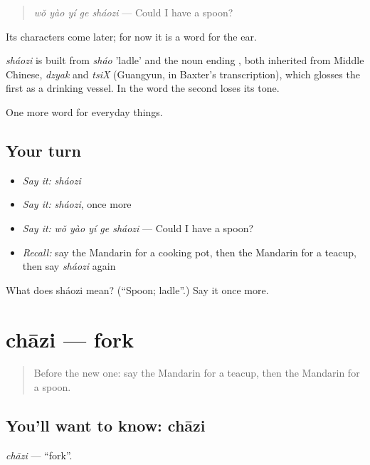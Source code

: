 \begin{quote}
\emph{wǒ yào yí ge sháozi} — Could I have a spoon?
\end{quote}

Its characters come later; for now it is a word for the ear.

\begin{cousinweb}
\emph{sháozi} is built from \emph{sháo} 'ladle' and the noun ending , both inherited from Middle Chinese, \emph{dzyak} and \emph{tsiX} (Guangyun, in Baxter's transcription), which glosses the first as a drinking vessel. In the word the second loses its tone.
\end{cousinweb}

\begin{grammarlens}[title={What you've built}]
One more word for everyday things.
\end{grammarlens}

\subsection*{Your turn}
\begin{itemize}
\raggedright
  \item \emph{Say it:} \emph{sháozi}
  \item \emph{Say it:} \emph{sháozi}, once more
  \item \emph{Say it:} \emph{wǒ yào yí ge sháozi} — Could I have a spoon?
  \item \emph{Recall:} say the Mandarin for a cooking pot, then the Mandarin for a teacup, then say \emph{sháozi} again
\end{itemize}

\begin{tcolorbox}[breakable,colback=teal!4,colframe=teal!35!black,title={Before you move on}]
What does sháozi mean? (\textquotedblleft{}Spoon; ladle\textquotedblright{}.) Say it once more.
\end{tcolorbox}
\section[chāzi]{chāzi — fork}

\label{lesson:ZH-C170-chazi}



\begin{quote}
Before the new one: say the Mandarin for a teacup, then the Mandarin for a spoon.
\end{quote}

\subsection*{You'll want to know: chāzi}
\emph{chāzi} — \textquotedblleft{}fork\textquotedblright{}.

